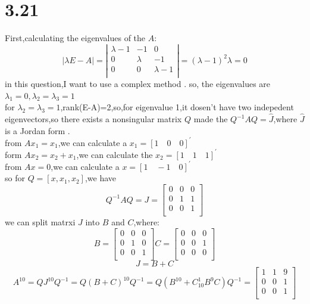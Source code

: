 \documentclass{article}
\begin{document}
\section*{3.21}
First,calculating the eigenvalues of the $A$:
\[
|\lambda E-A|=
\left|
\begin{array}{ccc}
\lambda-1 & -1 & 0\\
0 & \lambda & -1\\
0 & 0 & \lambda-1\\
\end{array}
\right|=
(\lambda-1)^2\lambda=0
\]
in this question,I want to use a complex method .
so, the eigenvalues are $\lambda_1=0,\lambda_2=\lambda_3=1$\\
for $\lambda_2=\lambda_3=1$,rank(E-A)=2,so,for eigenvalue 1,it dosen't have two indepedent eigenvectors,so there exists a nonsingular matrix $Q$ made the 
$Q^{-1}AQ=\hat{J}$,where $\hat{J}$ is a Jordan form .\\
from $Ax_1=x_1$,we can calculate a $x_1=[1 \quad 0 \quad 0]^{\prime}$\\
form $Ax_2=x_2+x_1$,we can calculate the $x_2=[1 \quad 1 \quad 1]^{\prime}$\\
from $Ax=0$,we can calculate a $x=[1 \quad -1 \quad 0]^{\prime}$\\
so for $Q=[x,x_1,x_2]$,we have 
\[Q^{-1}AQ=J=
\left[
\begin{array}{ccc}
0 & 0 &0\\
0 & 1 &1\\
0 & 0 &1\\
\end{array}
\right]
\]
we can split matrxi $J$ into $B$ and $C$,where:
\[
B=
\left[
\begin{array}{ccc}
0 & 0 & 0\\
0 & 1 & 0\\
0 & 0 & 1\\
\end{array}    
\right]
C=
\left[
\begin{array}{ccc}
0 & 0 & 0\\
0 & 0 & 1\\
0 & 0 & 0\\
\end{array}    
\right]
\]
\[J=B+C\]
\[A^{10}=QJ^{10}Q^{-1}=Q(B+C)^{10}Q^{-1}=Q(B^{10}+C^1_{10}B^9C)Q^{-1}=
\left[
\begin{array}{ccc}
1 & 1 &9\\
0 & 0 &1\\
0 & 0 &1\\
\end{array}
\right]
\]
\end{document}
